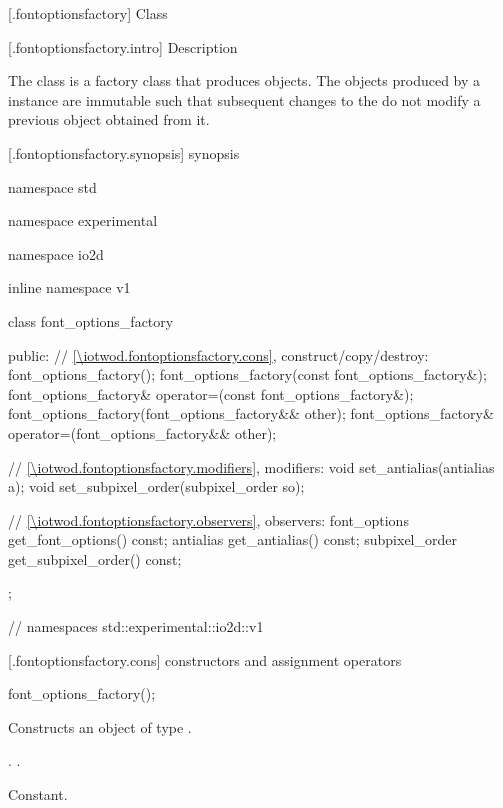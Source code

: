  [\iotwod.fontoptionsfactory] {Class }

 [\iotwod.fontoptionsfactory.intro] { 
Description}

\pnum
{}%
The  class is a factory class that produces 
 objects. The  objects produced by a 
 instance are immutable such that subsequent 
changes to the  do not modify a previous 
 object obtained from it.

 [\iotwod.fontoptionsfactory.synopsis] { 
synopsis}

\begin{codeblock}
namespace std { namespace experimental { namespace io2d { inline namespace v1 {
  class font_options_factory {
  public:
    // \ref{\iotwod.fontoptionsfactory.cons}, construct/copy/destroy:
    font_options_factory();
    font_options_factory(const font_options_factory&);
    font_options_factory& operator=(const font_options_factory&);
    font_options_factory(font_options_factory&& other);
    font_options_factory& operator=(font_options_factory&& other);

    // \ref{\iotwod.fontoptionsfactory.modifiers}, modifiers:
    void set_antialias(antialias a);
    void set_subpixel_order(subpixel_order so);

    // \ref{\iotwod.fontoptionsfactory.observers}, observers:
    font_options get_font_options() const;
    antialias get_antialias() const;
    subpixel_order get_subpixel_order() const;
  };
} } } } // namespaces std::experimental::io2d::v1
\end{codeblock}

 [\iotwod.fontoptionsfactory.cons] { 
constructors and 
assignment operators}

%
\begin{itemdecl}
font_options_factory();
\end{itemdecl}
\begin{itemdescr}
	\pnum
	\effects
	Constructs an object of type .
	
	\pnum
	\postconditions
	.
	.
	
	\pnum
	\complexity
	Constant.
\end{itemdescr}

